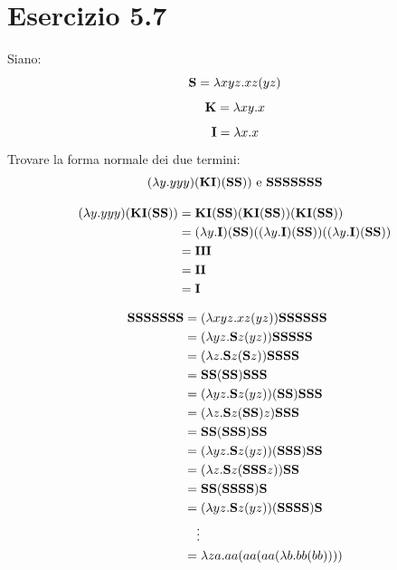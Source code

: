 	\section{Esercizio 5.7}
	
		Siano:
		\begin{equation*}
			\textbf{S} = \lambda xyz.xz(yz)
		\end{equation*}
		\begin{equation*}
			\textbf{K} = \lambda xy.x
		\end{equation*}
		\begin{equation*}
			\textbf{I} = \lambda x.x
		\end{equation*}
		Trovare la forma normale dei due termini:
		\begin{equation*}
			(\lambda y.yyy)(\textbf{K}\textbf{I})(\textbf{SS}))\text{ e }\textbf{SSSSSSS}
		\end{equation*}
		
		\sectionline
		
		\begin{align*}
			(\lambda y.yyy)(\textbf{K}\textbf{I}(\textbf{SS})) & =
			\textbf{K}\textbf{I}(\textbf{SS})(\textbf{K}\textbf{I}(\textbf{SS}))(\textbf{K}\textbf{I}(\textbf{SS}))\\
			& = (\lambda y.\textbf{I})(\textbf{SS})((\lambda y.\textbf{I})(\textbf{SS}))((\lambda
			y.\textbf{I})(\textbf{SS}))\\
			& = \textbf{I}\textbf{I}\textbf{I}\\
			& = \textbf{I}\textbf{I}\\
			& = \textbf{I}\\
		\end{align*}
		
		\begin{align*}
			\textbf{SSSSSSS} & = (\lambda xyz.xz(yz))\textbf{SSSSSS}\\
			& = (\lambda yz.\textbf{S} z(yz))\textbf{SSSSS}\\
			& = (\lambda z.\textbf{S} z(\textbf{S} z))\textbf{SSSS}\\
			& = \textbf{SS}(\textbf{SS})\textbf{SSS}\\
			& = (\lambda yz.\textbf{S} z(yz))(\textbf{SS})\textbf{SSS}\\
			& = (\lambda z.\textbf{S} z(\textbf{SS})z)\textbf{SSS}\\
			& = \textbf{SS}(\textbf{SSS})\textbf{SS}\\
			& = (\lambda yz.\textbf{S} z(yz))(\textbf{SSS})\textbf{SS}\\
			& = (\lambda z.\textbf{S} z(\textbf{SSS} z))\textbf{SS}\\
			& = \textbf{SS}(\textbf{SSSS})\textbf{S}\\
			& = (\lambda yz.\textbf{S} z(yz))(\textbf{SSSS})\textbf{S}\\
			& \quad \vdots\\
			& = \lambda za.a a(a a(a a(\lambda b.b b(b b))))\\
		\end{align*}
		
